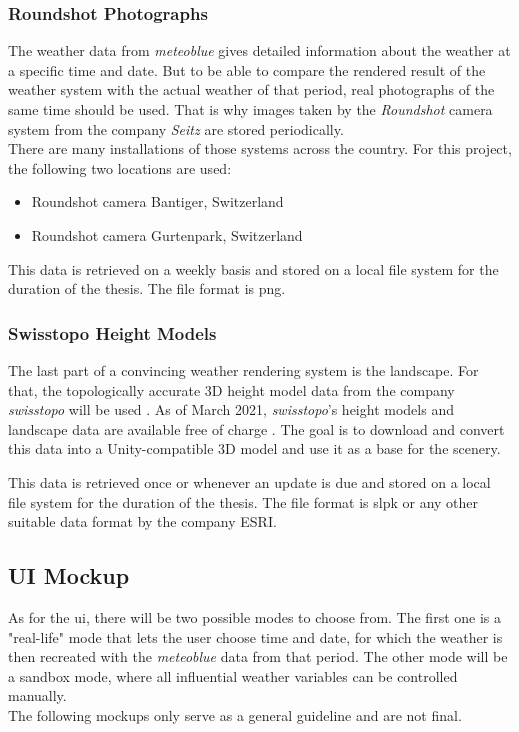 \subsubsection{Roundshot Photographs}
The weather data from \emph{meteoblue} gives detailed information about the weather at a specific time and date.
But to be able to compare the rendered result of the weather system with the actual weather of that period, real photographs of the same time should be used.
That is why images taken by the \emph{Roundshot} camera system from the company \emph{Seitz} \cite{roundshot} are stored periodically.
\\
There are many installations of those systems across the country. For this project, the following two locations are used: 
\begin{itemize}
    \item Roundshot camera Bantiger, Switzerland \cite{bantiger}
    \item Roundshot camera Gurtenpark, Switzerland \cite{gurtenpark}
\end{itemize}

\noindent
This data is retrieved on a weekly basis and stored on a local file system for the duration of the thesis. The file format is \gls{png}.

\subsubsection{Swisstopo Height Models}
The last part of a convincing weather rendering system is the landscape. For that, the topologically accurate 3D height model data from the company \emph{swisstopo} will be used \cite{swisstopo}.
As of March 2021, \emph{swisstopo}'s height models and landscape data are available free of charge \cite{swisstopo:free}.
The goal is to download and convert this data into a Unity-compatible 3D model and use it as a base for the scenery.

\noindent
This data is retrieved once or whenever an update is due and stored on a local file system for the duration of the thesis. The file format is \gls{slpk} or any other suitable data format by the company ESRI.

\clearpage

\subsection{UI Mockup}
As for the \gls{ui}, there will be two possible modes to choose from.
The first one is a "real-life" mode that lets the user choose time and date, for which the weather is then recreated with the \emph{meteoblue} data from that period.
The other mode will be a sandbox mode, where all influential weather variables can be controlled manually.
\\
The following mockups only serve as a general guideline and are not final.

